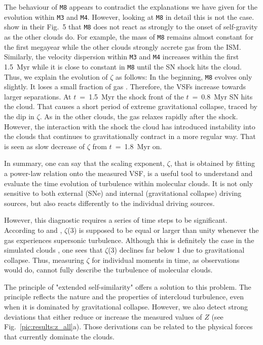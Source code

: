 The behaviour of \texttt{M8} appears to contradict the explanations we have given for the evolution within \texttt{M3} and \texttt{M4}.
However, looking at \texttt{M8} in detail this is not the case.
 show in their Fig.~5 that \texttt{M8} does not react as strongly to the onset of self-gravity as the other clouds do.
For example, the mass of \texttt{M8} remains almost constant for the first megayear while the other clouds strongly accrete gas from the ISM.
Similarly, the velocity dispersion within \texttt{M3} and \texttt{M4} increases within the first 1.5~Myr while it is close to constant in \texttt{M8} until the SN shock hits the cloud.
Thus, we explain the evolution of $\zeta$ as follows:
In the beginning, \texttt{M8} evolves only slightly.
It loses a small fraction of gas .
Therefore, the VSFs increase towards larger separations.
At $t$~=~1.5~Myr the shock front of the $t$~=~0.8~Myr SN hits the cloud.
That causes a short period of extreme gravitational collapse, traced by the dip in $\zeta$.
As in the other clouds, the gas relaxes rapidly after the shock.
However, the interaction with the shock the cloud has introduced instability into the clouds that continues to gravitationally contract in a more regular way.
That is seen as slow decrease of $\zeta$ from $t$~=~1.8~Myr on. 

In summary, one can say that the scaling exponent, $\zeta$, that is obtained by fitting a power-law relation onto the measured VSF, is a useful tool to understand and evaluate the time evolution of turbulence within molecular clouds. 
It is not only sensitive to both external (SNe) and internal (gravitational collapse) driving sources, but also reacts differently to the individual driving sources. 

However, this diagnostic requires a series of time steps to be significant.
According to \citet{She1994} and \citet{Boldyrev2002}, $\zeta$(3) is supposed to be equal or larger than unity whenever the gas experiences supersonic turbulence.
Although this is definitely the case in the simulated clouds , one sees that $\zeta$(3) declines far below 1 due to gravitational collapse.
Thus, measuring $\zeta$ for individual moments in time, as observations would do, cannot fully describe the turbulence of molecular clouds.

The principle of "extended self-similarity" \citep[Sect.~\ref{methods:vsf}]{Benzi1993} offers a solution to this problem.
The principle reflects the nature and the properties of intercloud turbulence, even when it is dominated by gravitational collapse.
However, we also detect strong deviations that either reduce or increase the measured values of $Z$ (see Fig.~\ref{pic:results:z_all}a).
Those derivations can be related to the physical forces that currently dominate the clouds.

